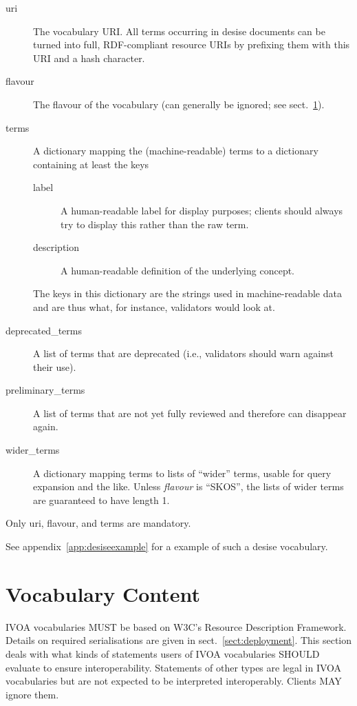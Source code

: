 \documentclass[11pt,a4paper]{ivoa}
\begin{document}
\begin{description}
\item[uri] The vocabulary URI.  All terms occurring in desise documents
can be turned into full, RDF-compliant resource URIs by prefixing them
with this URI and a hash character.
\item[flavour] The flavour of the vocabulary (can generally be ignored;
see sect.~\ref{sect:voccontent}).

\item[terms] A dictionary mapping the (machine-readable) terms to a
dictionary containing at least the keys
\begin{description}
\item[label] A human-readable label for display purposes; clients should
always try to display this rather than the raw term.
\item[description] A human-readable definition of the underlying
concept.
\end{description}
The keys in this dictionary are the strings used in machine-readable
data and are thus what, for instance, validators would look at.

\item[deprecated\_terms] A list of terms that are deprecated (i.e.,
validators should warn against their use).
\item[preliminary\_terms] A list of terms that are not yet fully
reviewed and therefore can disappear again.
\item[wider\_terms] A dictionary mapping terms to lists of ``wider''
terms, usable for query expansion and the like.  Unless \emph{flavour}
is ``SKOS'', the lists of wider terms are guaranteed to have length 1.
\end{description}

Only uri, flavour, and terms are mandatory.

See appendix~\ref{app:desiseexample} for a example of such a
desise vocabulary.

\section{Vocabulary Content}
\label{sect:voccontent}

IVOA vocabularies MUST be based on W3C's Resource Description Framework.
Details on required serialisations are given in
sect.~\ref{sect:deployment}.  This section deals with what kinds of
statements users of IVOA vocabularies SHOULD evaluate to ensure
interoperability.   Statements of other types are legal in IVOA
vocabularies but are not expected to be interpreted interoperably.
Clients MAY ignore them.
\end{document}
